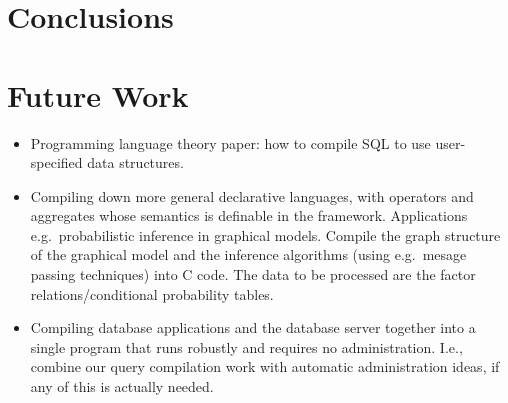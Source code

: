 \section{Conclusions}

\section{Future Work}


\begin{itemize}
\item
Programming language theory paper: how to compile SQL to use user-specified
data structures.

\item
Compiling down more general declarative languages, with operators and
aggregates whose semantics is definable in the framework. Applications e.g.\
probabilistic inference in graphical models. Compile the graph structure
of the graphical model and the inference algorithms (using e.g.\ mesage
passing techniques) into C code. The data to be processed are the factor
relations/conditional probability tables.

\item
Compiling database applications and the database server together into a single
program that runs robustly and requires no administration. I.e., combine
our query compilation work with automatic administration ideas, if any of
this is actually needed.
\end{itemize}

